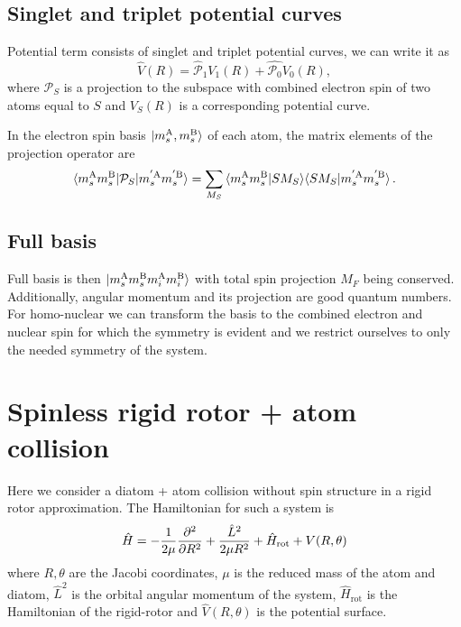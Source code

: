 \documentclass[a4paper]{article}
\begin{document}
\subsection{Singlet and triplet potential curves}
    Potential term consists of singlet and triplet potential curves, we can write it as
    \begin{equation}
        \hat{V}(R) = \hat{\mathcal{P}}_1 V_1(R) + \hat{\mathcal{P}_0} V_0(R),
    \end{equation}
    where \(\mathcal{P}_S\) is a projection to the subspace with combined electron spin of two atoms equal to $S$
    and \(V_S(R)\) is a corresponding potential curve.

    In the electron spin basis \(\ket{m_s^\text{A}, m_s^\text{B}}\) of each atom,
    the matrix elements of the projection operator are
    \begin{equation}
        \braket{m_s^\text{A} m_s^\text{B} | \mathcal{P}_S | m_s^{'\text{A}} m_s^{'\text{B}}}
            = \sum_{M_S} \braket{m_s^\text{A} m_s^\text{B} | S M_S}\!\braket{S M_S| m_s^{'\text{A}} m_s^{'\text{B}}}.
    \end{equation}

\subsection{Full basis}
    Full basis is then \(\ket{m_s^\text{A} m_s^\text{B} m_i^\text{A} m_i^\text{B}}\) with total spin projection \(M_F\) being conserved.
    Additionally, angular momentum and its projection are good quantum numbers.
    For homo-nuclear we can transform the basis to the combined electron and nuclear spin for which the symmetry is evident
    and we restrict ourselves to only the needed symmetry of the system.

\section{Spinless rigid rotor + atom collision}
    Here we consider a diatom + atom collision without spin structure in a rigid rotor approximation.
    The Hamiltonian for such a system is
    \begin{equation}
        \hat{H} = -\frac{1}{2\mu}\pdv[order=2]{}{R} + \frac{\hat{L}^2}{2\mu R^2} + \hat{H}_\text{rot} + V(R, \theta)
    \end{equation}
    where $R, \theta$ are the Jacobi coordinates, $\mu$ is the reduced mass of the atom and diatom, 
    \(\hat{L}^2\) is the orbital angular momentum of the system,
    \(\hat{H}_\text{rot}\) is the Hamiltonian of the rigid-rotor and \(\hat{V}(R, \theta)\) 
    is the potential surface.
\end{document}
